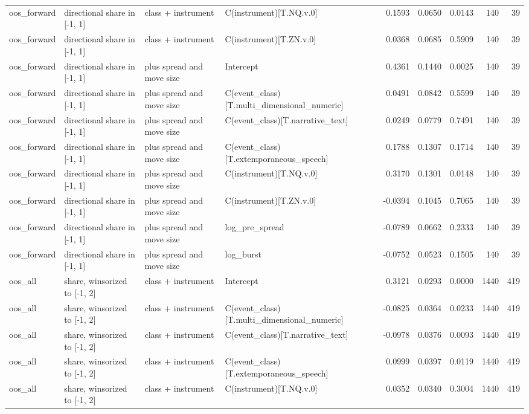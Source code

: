 \begin{tabular}{llllrrrrr}
oos_forward & directional share in [-1, 1] & class + instrument & C(instrument)[T.NQ.v.0] & 0.1593 & 0.0650 & 0.0143 & 140 & 39 \\
oos_forward & directional share in [-1, 1] & class + instrument & C(instrument)[T.ZN.v.0] & 0.0368 & 0.0685 & 0.5909 & 140 & 39 \\
oos_forward & directional share in [-1, 1] & plus spread and move size & Intercept & 0.4361 & 0.1440 & 0.0025 & 140 & 39 \\
oos_forward & directional share in [-1, 1] & plus spread and move size & C(event_class)[T.multi_dimensional_numeric] & 0.0491 & 0.0842 & 0.5599 & 140 & 39 \\
oos_forward & directional share in [-1, 1] & plus spread and move size & C(event_class)[T.narrative_text] & 0.0249 & 0.0779 & 0.7491 & 140 & 39 \\
oos_forward & directional share in [-1, 1] & plus spread and move size & C(event_class)[T.extemporaneous_speech] & 0.1788 & 0.1307 & 0.1714 & 140 & 39 \\
oos_forward & directional share in [-1, 1] & plus spread and move size & C(instrument)[T.NQ.v.0] & 0.3170 & 0.1301 & 0.0148 & 140 & 39 \\
oos_forward & directional share in [-1, 1] & plus spread and move size & C(instrument)[T.ZN.v.0] & -0.0394 & 0.1045 & 0.7065 & 140 & 39 \\
oos_forward & directional share in [-1, 1] & plus spread and move size & log_pre_spread & -0.0789 & 0.0662 & 0.2333 & 140 & 39 \\
oos_forward & directional share in [-1, 1] & plus spread and move size & log_burst & -0.0752 & 0.0523 & 0.1505 & 140 & 39 \\
oos_all & share, winsorized to [-1, 2] & class + instrument & Intercept & 0.3121 & 0.0293 & 0.0000 & 1440 & 419 \\
oos_all & share, winsorized to [-1, 2] & class + instrument & C(event_class)[T.multi_dimensional_numeric] & -0.0825 & 0.0364 & 0.0233 & 1440 & 419 \\
oos_all & share, winsorized to [-1, 2] & class + instrument & C(event_class)[T.narrative_text] & -0.0978 & 0.0376 & 0.0093 & 1440 & 419 \\
oos_all & share, winsorized to [-1, 2] & class + instrument & C(event_class)[T.extemporaneous_speech] & 0.0999 & 0.0397 & 0.0119 & 1440 & 419 \\
oos_all & share, winsorized to [-1, 2] & class + instrument & C(instrument)[T.NQ.v.0] & 0.0352 & 0.0340 & 0.3004 & 1440 & 419 \\

\end{tabular}
